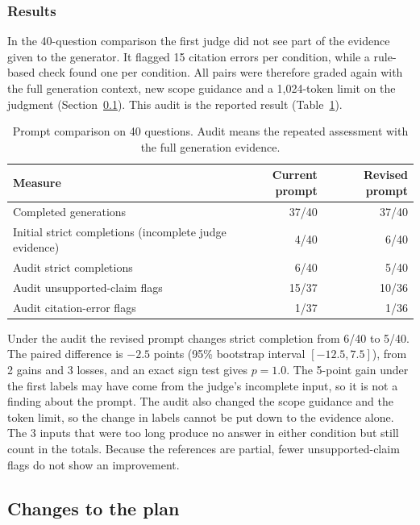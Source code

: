 \subsubsection{Results}
\label{sec:results-prompt}

In the 40-question comparison the first judge did not see part of the evidence given to the generator. It flagged 15 citation errors per condition, while a rule-based check found one per condition. All pairs were therefore graded again with the full generation context, new scope guidance and a 1,024-token limit on the judgment (Section~\ref{sec:method-deviations}). This audit is the reported result (Table~\ref{tab:prompt}).

\begin{table}[t]
\centering\small
\caption[Prompt comparison on 40 questions]{Prompt comparison on 40 questions. Audit means the repeated assessment with the full generation evidence.}\label{tab:prompt}
\begin{tabular}{lrr}
\toprule
Measure & Current prompt & Revised prompt\\
\midrule
Completed generations & 37/40 & 37/40\\
Initial strict completions (incomplete judge evidence) & 4/40 & 6/40\\
Audit strict completions & 6/40 & 5/40\\
Audit unsupported-claim flags & 15/37 & 10/36\\
Audit citation-error flags & 1/37 & 1/36\\
\bottomrule
\end{tabular}
\end{table}

Under the audit the revised prompt changes strict completion from 6/40 to 5/40. The paired difference is $-2.5$ points (95\% bootstrap interval $[-12.5,7.5]$), from 2 gains and 3 losses, and an exact sign test gives $p=1.0$. The 5-point gain under the first labels may have come from the judge's incomplete input, so it is not a finding about the prompt. The audit also changed the scope guidance and the token limit, so the change in labels cannot be put down to the evidence alone. The 3 inputs that were too long produce no answer in either condition but still count in the totals. Because the references are partial, fewer unsupported-claim flags do not show an improvement.

\subsection{Changes to the plan}
\label{sec:method-deviations}

